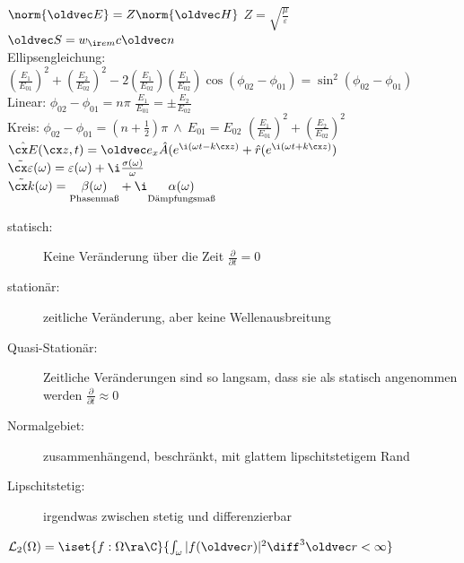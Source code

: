 \documentclass[6pt,a4paper]{scrartcl}
\let\vec\oldvec
\begin{document}
\begin{multicols}{4}
	$\norm{\vec E} = Z \norm{\vec H}$ \qquad $Z = \sqrt{\frac{\mu}{\varepsilon}}$\\
	$\vec S = w_{\ir em} c \vec n$\\

	Ellipsengleichung:\\
	$\left(\frac{E_1}{E_{01}}\right)^2 + \left(\frac{E_2}{E_{02}}\right)^2 - 2\left(\frac{E_1}{E_{02}}\right)\left(\frac{E_1}{E_{02}}\right) \cos(\phi_{02} - \phi_{01}) = \sin^2(\phi_{02} - \phi_{01})$\\
	Linear: $\phi_{02} - \phi_{01} = n\pi$ \qquad $\frac{E_1}{E_{01}} = \pm \frac{E_2}{E_{02}}$\\
	Kreis: $\phi_{02} - \phi_{01} = (n+\frac{1}{2}) \pi \ \land \ E_{01} = E_{02}$ \qquad $\left(\frac{E_1}{E_{01}}\right)^2 + \left(\frac{E_2}{E_{02}}\right)^2$\\

	$\hat{\cx E}(\cx z,t) = \vec e_x \hat A(e^{\i(\omega t - k \cx z)} + \hat r(e^{\i(\omega t + k \cx z)})$\\

	$\tilde{\cx \varepsilon}(\omega) = \varepsilon(\omega) + \i \frac{\sigma(\omega)}{\omega}$\\
	$\tilde{\cx k}(\omega) = \underset{\text{Phasenmaß}}{\beta(\omega)} + \i \underset{\text{Dämpfungsmaß}}{\alpha(\omega)}$\\
	
	\begin{description}
		\item[statisch:] Keine Veränderung über die Zeit $\frac{\partial}{\partial t} = 0$
		\item[stationär:] zeitliche Veränderung, aber keine Wellenausbreitung
		\item[Quasi-Stationär:] Zeitliche Veränderungen sind so langsam, dass sie als statisch angenommen werden $\frac{\partial}{\partial t} \approx 0$
		\item[Normalgebiet:] zusammenhängend, beschränkt, mit glattem lipschitstetigem Rand
		\item[Lipschitstetig:] irgendwas zwischen stetig und differenzierbar
	\end{description}
	$\mathcal L_2(\Omega) = \iset{f:\Omega \ra \C}{\int_\omega |f(\vec r)|^2 \diff^3 \vec r < \infty }$\\
	
	
	

\end{multicols}
\end{document}
